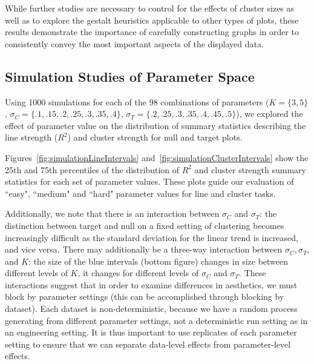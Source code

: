 \documentclass[12pt]{article}\usepackage[]{graphicx}\usepackage[]{color}
\begin{document}
While further studies are necessary to control for the effects of cluster sizes as well as to explore the gestalt heuristics applicable to other types of plots, these results demonstrate the importance of carefully constructing graphs in order to consistently convey the most important aspects of the displayed data. 




\newpage
\begin{appendix}
\section{Simulation Studies of Parameter Space}\label{app:parametersimulation}

Using 1000 simulations for each of the 98 combinations of parameters ($K=\{3,5\}$, $\sigma_C=\{.1, .15, .2, .25, .3, .35, .4\}$, $\sigma_T=\{.2, .25, .3, .35, .4, .45, .5\}$), we explored the effect of parameter value on the distribution of summary statistics describing the line strength ($R^2$) and cluster strength for null and target plots. 

Figures~\ref{fig:simulationLineIntervals} and~\ref{fig:simulationClusterIntervals} show the 25th and 75th percentiles of the distribution of $R^2$ and cluster strength summary statistics for each set of parameter values. These plots guide our evaluation of ``easy", ``medium" and ``hard" parameter values for line and cluster tasks. 

Additionally, we note that there is an interaction between $\sigma_C$ and $\sigma_T$: the distinction between target and null on a fixed setting of clustering becomes increasingly difficult as the standard deviation for the linear trend is increased, and vice versa. There may additionally be a three-way interaction between $\sigma_C, \sigma_T$, and $K$: the size of the blue intervals (bottom figure) changes in size between different levels of $K$, it changes for different levels of $\sigma_C$ and $\sigma_T$. These interactions suggest that in order to examine differences in aesthetics, we must block by parameter settings (this can be accomplished through blocking by dataset). Each dataset is non-deterministic, because we have a random process generating from different parameter settings, not a deterministic run setting as in an engineering setting. It is thus important to use replicates of each parameter setting to ensure that we can separate data-level effects from parameter-level effects. 




\end{appendix}
\end{document}

